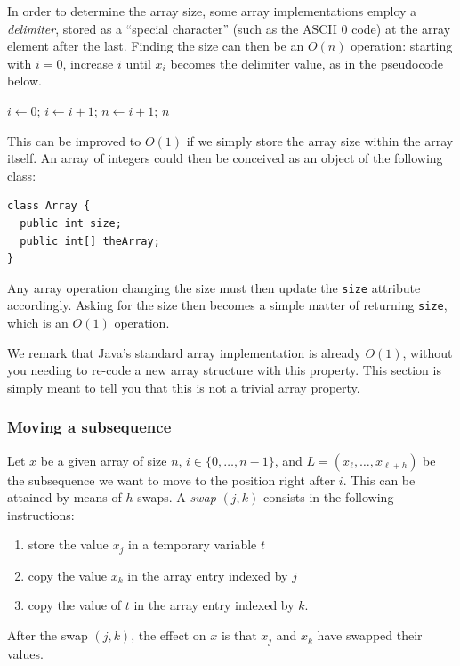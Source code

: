 \documentclass[a4paper]{book}
\theoremstyle{changebreak}                %
\begin{document}
In order to determine the array size, some array implementations
employ a {\it delimiter},
stored as a ``special character'' (such as the ASCII 0 code) at the
array element after the last. Finding the size can then be an $O(n)$
operation: starting with $i=0$, increase $i$ until $x_i$ becomes the
delimiter value, as in the pseudocode below.
\begin{algorithmic}
  \STATE $i\leftarrow 0$;
    \STATE $i\leftarrow i+1$;
  \ENDWHILE
  \STATE $n\leftarrow i+1$;
  \RETURN $n$
\end{algorithmic}

This can be improved to $O(1)$ if we simply store the array size
within the array itself. An array of integers could then be conceived
as an object of the following class:
\begin{verbatim}
class Array {
  public int size;
  public int[] theArray;
}
\end{verbatim}
Any array operation changing the size must then update the {\tt size}
attribute accordingly. Asking for the size then becomes a simple
matter of returning {\tt size}, which is an $O(1)$ operation.

We remark that Java's standard array implementation is already $O(1)$,
without you needing to re-code a new array structure with this
property. This section is simply meant to tell you that this is not a
trivial array property. 

\subsubsection{Moving a subsequence}
\label{s:linear:array:splice}
Let $x$ be a given array of size $n$, $i\in\{0,\ldots,n-1\}$, and
$L=(x_\ell,\ldots,x_{\ell+h})$ be the subsequence
we want to move to the position right after $i$. This can be attained
by means of $h$ swaps. A {\it swap}
$(j,k)$ consists in the following instructions:
\begin{enumerate}
\item store the value $x_j$ in a temporary
  variable $t$
\item copy the value $x_k$ in the array entry
  indexed by $j$
\item copy the value of $t$ in the array entry indexed by $k$.
\end{enumerate}
After the swap $(j,k)$, the effect on $x$ is that $x_j$ and $x_k$ have
swapped their values. 
\end{document}
